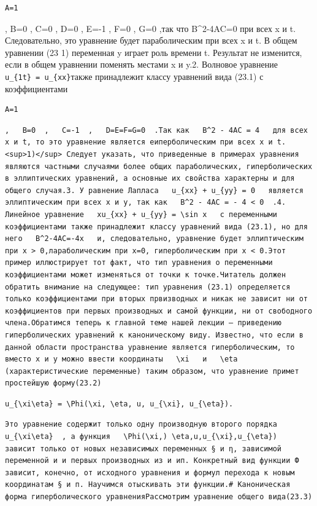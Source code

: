 \documentclass[
  ukrainian,
]{article}
\begin{document}
\begin{verbatim}
A=1
\end{verbatim}

, B=0 , C=0 , D=0 , E=-1 , F=0 , G=0 ,так что B\^{}2-4AC=0 при всех x и
t. Следовательно, это уравнение будет параболическим при всех x и t. В
общем уравнении (23 1) переменная y играет роль времени t. Результат не
изменится, если в общем уравнении поменять местами x и y.2. Волновое
уравнение \texttt{u\_\{1t\}\ =\ u\_\{xx\}}также принадлежит классу
уравнений вида (23.1) с коэффициентами

\begin{verbatim}
A=1
\end{verbatim}

\begin{verbatim}
,   B=0  ,   C=-1  ,   D=E=F=G=0  .Так как   B^2 - 4AC = 4   для всех x и t, то это уравнение является еиперболическим при всех x и t.<sup>1)</sup> Следует указать, что приведенные в примерах уравнения являются частными случаями более общих параболических, гиперболических в эллиптических уравнений, а основные их свойства характерны и для общего случая.3. У равнение Лапласа   u_{xx} + u_{yy} = 0   является эллиптическим при всех x и y, так как   B^2 - 4AC = - 4 < 0  .4. Линейное уравнение   xu_{xx} + u_{yy} = \sin x   с переменными коэффициентами также принадлежит классу уравнений вида (23.1), но для него   B^2-4AC=-4x   и, следовательно, уравнение будет эллиптическим при x > 0,лараболическим при x=0, гиперболическим при x < 0.Этот пример иллюстрирует тот факт, что тип уравнения о переменными коэффициентами может изменяться от точки к точке.Читатель должен обратить внимание на следующее: тип уравнения (23.1) определяется только коэффициентами при вторых првизводных и никак не зависит ни от коэффициентов при первых производных и самой функции, ни от свободного члена.Обратимся теперь к главной теме нашей лекции — приведению гиперболических уравнений к каноническому виду. Известно, что если в данной области пространства уравнение является гиперболическим, то вместо x и y можно ввести координаты   \xi   и   \eta  (характеристические переменные) таким образом, что уравнение примет простейшую форму(23.2)
\end{verbatim}

\begin{verbatim}
u_{\xi\eta} = \Phi(\xi, \eta, u, u_{\xi}, u_{\eta}).
\end{verbatim}

\begin{verbatim}
Это уравнение содержит только одну производную второго порядка   u_{\xi\eta}  , а функция   \Phi(\xi,) \eta,u,u_{\xi},u_{\eta})   зависит только от новых независимых переменных § и η, зависимой переменной и и первых производных из и ип. Конкретный вид функции Ф зависит, конечно, от исходного уравнения и формул перехода к новым координатам § и п. Научимся отыскивать эти функции.# Каноническая форма гиперболического уравненияРассмотрим уравнение общего вида(23.3)
\end{verbatim}
\end{document}
